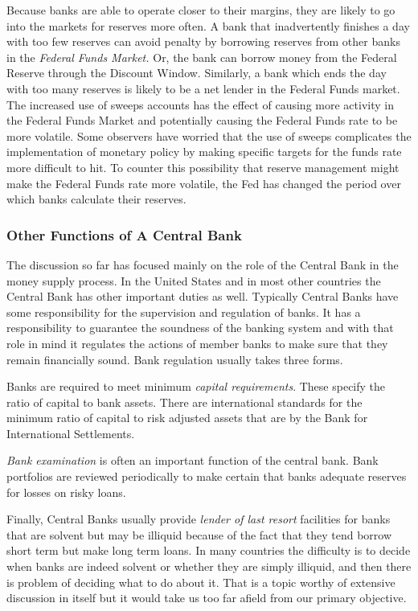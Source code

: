 \documentclass[letterpaper,12pt]{article}
\begin{document}
Because banks are able to operate closer to their margins, they are
likely to go into the markets for reserves more often. A bank that
inadvertently finishes a day with too few reserves can avoid penalty
by borrowing reserves from other banks in the \textit{Federal Funds
Market. }Or, the bank can borrow money from the Federal Reserve
through the Discount Window. Similarly, a bank which ends the day
with too many reserves is likely to be a net lender in the Federal
Funds market. The increased use of sweeps accounts has the effect of
causing more activity in the Federal Funds Market and potentially
causing the Federal Funds rate to be more volatile. Some observers
have worried that the use of sweeps complicates the implementation
of monetary policy by making specific targets for the funds rate
more difficult to hit. To counter this possibility that reserve
management might make the Federal Funds rate more volatile, the Fed
has changed the period over which banks calculate their reserves.

\subsubsection*{Other Functions of A Central Bank}

The discussion so far has focused mainly on the role of the Central
Bank in the money supply process. In the United States and in most
other countries the Central Bank has other important duties as well.
Typically Central Banks have some responsibility for the supervision
and regulation of banks. It has a responsibility to guarantee the
soundness of the banking system and with that role in mind it
regulates the actions of member banks to make sure that they remain
financially sound. Bank regulation usually takes three forms.

Banks are required to meet minimum \textit{capital requirements}.
These specify the ratio of capital to bank assets. There are
international standards for the minimum ratio of capital to risk
adjusted assets that are by the Bank for International Settlements.

\textit{Bank examination} is often an important function of the
central bank. Bank portfolios are reviewed periodically to make
certain that banks adequate reserves for losses on risky loans.

Finally, Central Banks usually provide \textit{lender of last
resort} facilities for banks that are solvent but may be illiquid
because of the fact that they tend borrow short term but make long
term loans. In many countries the difficulty is to decide when banks
are indeed solvent or whether they are simply illiquid, and then
there is problem of deciding what to do about it. That is a topic
worthy of extensive discussion in itself but it would take us too
far afield from our primary objective.
\end{document}
